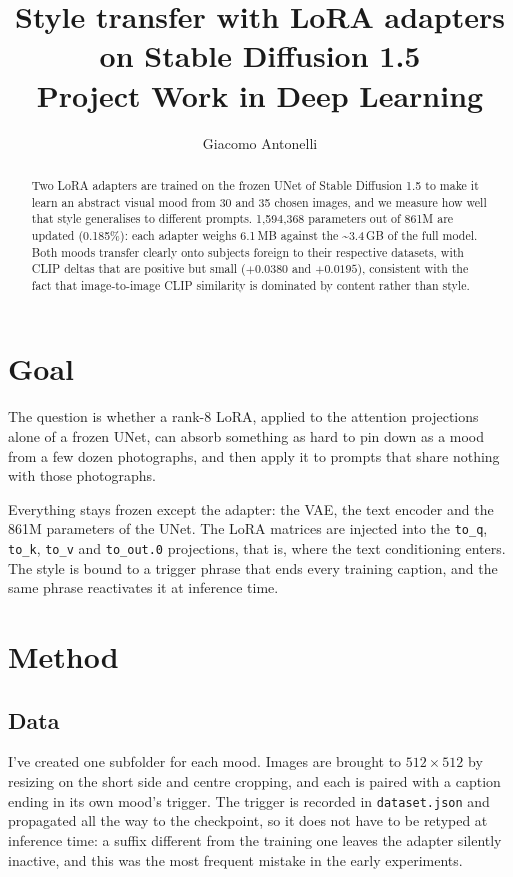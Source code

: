 \documentclass[11pt,a4paper]{article}
\title{\vspace{-1.5cm}Style transfer with LoRA adapters on Stable Diffusion 1.5\\[0.3em]
  \large Project Work in Deep Learning}
\author{Giacomo Antonelli}
\begin{document}
\maketitle

\begin{abstract}
\noindent
Two LoRA adapters are trained on the frozen UNet of Stable Diffusion 1.5 to make it learn an
abstract visual mood from 30 and 35 chosen images, and we measure how well that
style generalises to different prompts. 1,594,368 parameters out of 861M are
updated (0.185\%): each adapter weighs 6.1\,MB against the \textasciitilde3.4\,GB of the full
model. Both moods transfer clearly onto subjects foreign to their respective datasets, with
CLIP deltas that are positive but small ($+0.0380$ and $+0.0195$), consistent with the fact that
image-to-image CLIP similarity is dominated by content rather than style.
\end{abstract}

\section{Goal}

The question is whether a rank-8 LoRA, applied to the attention projections alone of a frozen
UNet, can absorb something as hard to pin down as a mood from a few dozen photographs, and
then apply it to prompts that share nothing with those photographs.

Everything stays frozen except the adapter: the VAE, the text encoder and the 861M parameters of
the UNet. The LoRA matrices are injected into the \texttt{to\_q}, \texttt{to\_k}, \texttt{to\_v}
and \texttt{to\_out.0} projections, that is, where the text conditioning enters. The style is
bound to a trigger phrase that ends every training caption, and the same phrase reactivates it at
inference time.

\section{Method}

\subsection{Data}

I've created one subfolder for each mood. Images are brought to $512\times512$ by resizing on the short side and
centre cropping, and each is paired with a caption ending in its own mood's trigger. The trigger
is recorded in \texttt{dataset.json} and propagated all the way to the checkpoint, so it does not
have to be retyped at inference time: a suffix different from the training one leaves the adapter
silently inactive, and this was the most frequent mistake in the early experiments.
\end{document}
